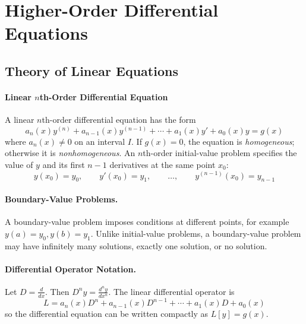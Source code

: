\documentclass[oneside]{book}
\begin{document}
\section{Higher-Order Differential Equations}

\subsection{Theory of Linear Equations}

\paragraph{Linear $n$th-Order Differential Equation}{
    A linear $n$th-order differential equation has the form
    \[
        a_n(x)y^{(n)}+a_{n-1}(x)y^{(n-1)}+\cdots+a_1(x)y'+a_0(x)y=g(x)
    \]
    where $a_n(x)\neq 0$ on an interval $I$. If $g(x)=0$, the equation is
    \emph{homogeneous}; otherwise it is \emph{nonhomogeneous}. An $n$th-order initial-value problem specifies the value of $y$ and its first
    $n-1$ derivatives at the same point $x_0$:
    \[
        y(x_0)=y_0,\qquad
        y'(x_0)=y_1,\qquad
        \ldots,\qquad
        y^{(n-1)}(x_0)=y_{n-1}
    \]
}



\paragraph{Boundary-Value Problems.}
A boundary-value problem imposes conditions at different points, for example $y(a)=y_0, y(b)=y_1$. Unlike initial-value problems, a boundary-value problem may have infinitely many
solutions, exactly one solution, or no solution.

\paragraph{Differential Operator Notation.}
Let $D=\frac{d}{dx}$. Then $D^n y=\frac{d^n y}{dx^n}$. The linear differential operator is
\[
    L=a_n(x)D^n+a_{n-1}(x)D^{n-1}+\cdots+a_1(x)D+a_0(x)
\]
so the differential equation can be written compactly as $L[y]=g(x)$. 
\end{document}
